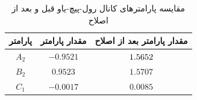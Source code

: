 \vspace{1.5cm}
\begin{table}[H]
	\begin{center}
		\begin{tabular}{ccc}\hline
			پارامتر & مقدار پارامتر  & مقدار پارامتر بعد از اصلاح
			\\ \hline
			$A_2$  & $-0.9521$ & $\-1.5652$ \\
			$B_2$  & $0.9523$ & $1.5707$ \\ 
			$C_1$  & $-0.0017$ & $0.0085$ \\ \hline
		\end{tabular}
	\end{center}
	\caption {مقايسه پارامترهای کانال رول-پیچ-یاو قبل و بعد از اصلاح}
\end{table}
